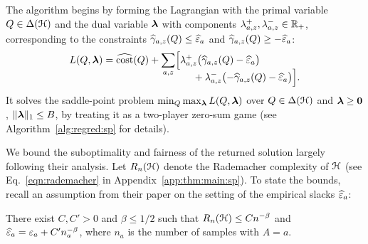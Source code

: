 \documentclass{article}
\begin{document}
The algorithm begins by forming the Lagrangian with the primal variable $Q\in\Delta(\mathcal{H})$ and the dual variable $\boldsymbol{\lambda}$ with components
$\lambda_{a,z}^+,\lambda_{a,z}^-\in\mathbb{R}_+$, corresponding to the constraints $\widehat{\gamma}_{a,z}(Q)\le \widehat{\varepsilon}_{a}$ and $\widehat{\gamma}_{a,z}(Q)\ge-\widehat{\varepsilon}_{a}$:
%
\begin{align*}
  L(Q,\boldsymbol{\lambda})
&=\widehat{\textup{\mdseries cost}}(Q)+\sum_{a,z}\Bigl[
            \lambda^+_{a,z}\bigl(\widehat{\gamma}_{a,z}(Q)-\widehat{\varepsilon}_a\bigr)
\\[-12pt]
&\hspace{1.25in}
           +\lambda^-_{a,z}\bigl(-\widehat{\gamma}_{a,z}(Q)-\widehat{\varepsilon}_a\bigr)\Bigr].
\end{align*}
%
It solves the saddle-point problem $\min_Q\max_{\boldsymbol{\lambda}} L(Q,\boldsymbol{\lambda})$
over $Q\in\Delta(\mathcal{H})$ and $\boldsymbol{\lambda}\ge\mathbf{0}$, $\lVert\boldsymbol{\lambda}\rVert_1\le B$,
%
%
by treating it as a two-player zero-sum game (see Algorithm~\ref{alg:regred:sp} for details).

%

We bound the suboptimality and fairness of the returned solution
largely following their analysis. Let $R_n(\mathcal{H})$ denote the Rademacher complexity of $\mathcal{H}$ (see Eq.~\ref{eqn:rademacher} in Appendix~\ref{app:thm:main:sp}). To state the bounds, recall an assumption from their paper on the setting of the empirical slacks $\widehat{\varepsilon}_{a}$:
%
\begin{assume}
    There exist $C, C' > 0$ and $\beta \leq 1/2$ such that $R_n(\mathcal{H}) \leq Cn^{-\beta}$ and $\widehat{\varepsilon}_{a} = \varepsilon_{a} + C'n_{a}^{-\beta}$, where $n_{a}$ is the number of samples with $A = a$.
\label{ass:samples}
\end{assume}
\end{document}
